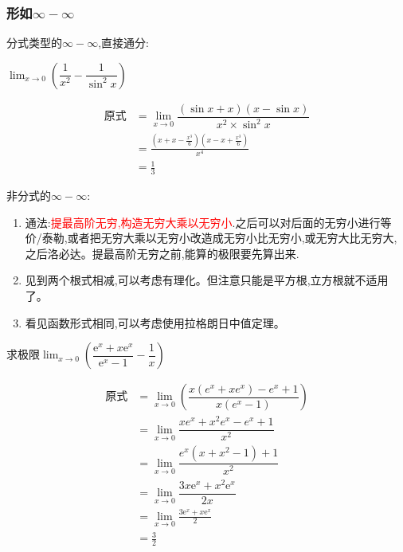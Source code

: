 \documentclass[8pt a4paper, oneside, UTF8]{ctexbook}
\begin{document}
\begin{sloppypar}
    \subsubsection{形如$\infty -\infty$}
    分式类型的$\infty -\infty$,直接通分:
    \begin{problem}
        $\lim_{x\to 0}(\dfrac{1}{x^2}-\dfrac{1}{\sin ^2 x})$        
    \end{problem}
    \begin{solution}
        \begin{align*}
          \text{原式} & =\lim_{x\to 0}\dfrac{(\sin x +x)(x- \sin x)}{x^2 \times \sin^2 x}\\
          & = \frac{(x+x-\frac{x^3}{6})(x-x+\frac{x^3}{6})}{x^4}\\
          & = \frac{1}{3}
        \end{align*}
    \end{solution}
    非分式的$\infty -\infty$:
    \begin{enumerate}
        \item 通法:\textcolor{red}{提最高阶无穷,构造无穷大乘以无穷小}.之后可以对后面的无穷小进行等价/泰勒,或者把无穷大乘以无穷小改造成无穷小比无穷小,或无穷大比无穷大,之后洛必达。提最高阶无穷之前,能算的极限要先算出来.
        \item 见到两个根式相减,可以考虑有理化。但注意只能是平方根,立方根就不适用了。
        \item 看见函数形式相同,可以考虑使用拉格朗日中值定理。
    \end{enumerate}
    \begin{problem}
        求极限$\lim_{x\to0}\left(\dfrac{\mathrm{e}^x+x\mathrm{e}^x}{\mathrm{e}^x-1}-\dfrac1x\right)$
    \end{problem}
    \begin{solution}
        \begin{align*}
          \text{原式} & =  \lim_{x\to0} (\dfrac{x(e^x+xe^x)-e^x+1}{x(e^x-1)})  \\
          & = \lim_{x\to0} \dfrac{xe^x+x^2e^x-e^x+1}{x^2}\\
          & = \lim_{x\to0} \dfrac{e^x(x+x^2-1)+1}{x^2}\\
          & = \lim_{x\to0}\dfrac{3x\mathrm{e}^{x}+x^{2}\mathrm{e}^{x}}{2x}\\
          & =\lim_{x\to0}\frac{3\mathrm{e}^{x}+x\mathrm{e}^{x}}{2}\\
          & =\frac{3}{2}
        \end{align*}    
    \end{solution}

\end{sloppypar}
\end{document}
